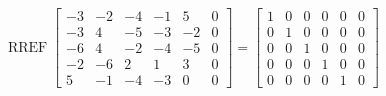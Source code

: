 \begin{exerciseAnswer} 


\[\operatorname{RREF} \left[\begin{array}{ccccc|c}
-3 & -2 & -4 & -1 & 5 & 0 \\
-3 & 4 & -5 & -3 & -2 & 0 \\
-6 & 4 & -2 & -4 & -5 & 0 \\
-2 & -6 & 2 & 1 & 3 & 0 \\
5 & -1 & -4 & -3 & 0 & 0
\end{array}\right] = \left[\begin{array}{ccccc|c}
1 & 0 & 0 & 0 & 0 & 0 \\
0 & 1 & 0 & 0 & 0 & 0 \\
0 & 0 & 1 & 0 & 0 & 0 \\
0 & 0 & 0 & 1 & 0 & 0 \\
0 & 0 & 0 & 0 & 1 & 0
\end{array}\right] \]



\end{exerciseAnswer}
